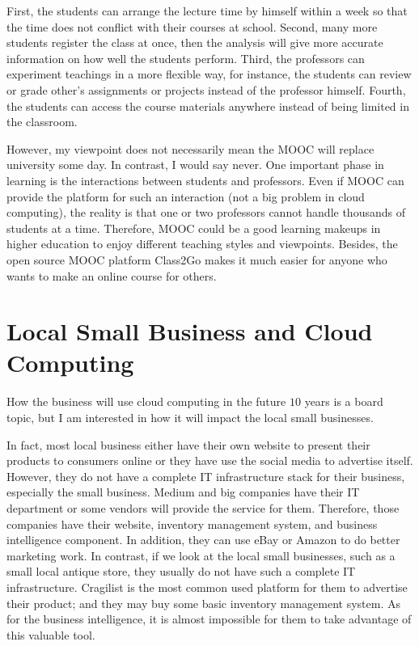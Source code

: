 First, the students can arrange the lecture time by himself within a week so that the time does not conflict with their courses at school. Second, many more students register the class at once, then the analysis will give more accurate information on how well the students perform. Third, the professors can experiment teachings in a more flexible way, for instance, the students can review or grade other's assignments or projects instead of the professor himself. Fourth, the students can access the course materials anywhere instead of being limited in the classroom.

However, my viewpoint does not necessarily mean the MOOC will replace university some day. In contrast, I would say never. One important phase in learning is the interactions between students and professors. Even if MOOC can provide the platform for such an interaction (not a big problem in cloud computing), the reality is that one or two professors cannot handle thousands of students at a time. Therefore, MOOC could be a good learning makeups in higher education to enjoy different teaching styles and viewpoints. Besides, the open source MOOC platform Class2Go\cite{class2go} makes it much easier for anyone who wants to make an online course for others.

\section{Local Small Business and Cloud Computing}
How the business will use cloud computing in the future $10$ years is a board topic, but I am interested in how it will impact the local small businesses. 


In fact, most local business either have their own website to present their products to consumers online or they have use the social media to advertise itself. However, they do not have a complete IT infrastructure stack for their business, especially the small business. Medium and big companies have their IT department or some vendors will provide the service for them. Therefore, those companies have their website, inventory management system, and business intelligence component. In addition, they can use eBay or Amazon to do better marketing work. In contrast, if we look at the local small businesses, such as a small local antique store, they usually do not have such a complete IT infrastructure. Cragilist is the most common used platform for them to advertise their product; and they may buy some basic inventory management system. As for the business intelligence, it is almost impossible for them to take advantage of this valuable tool.

